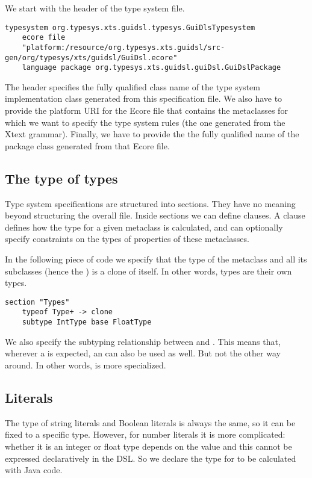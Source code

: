We start with the header of the type system file.

\begin{lstlisting}[language=xts] 
typesystem org.typesys.xts.guidsl.typesys.GuiDlsTypesystem 
    ecore file 
    "platform:/resource/org.typesys.xts.guidsl/src-gen/org/typesys/xts/guidsl/GuiDsl.ecore"
    language package org.typesys.xts.guidsl.guiDsl.GuiDslPackage 
\end{lstlisting}

The header specifies the fully qualified class name of the type system
implementation class generated from this specification file. We also have to
provide the platform URI for the Ecore file that contains the metaclasses for
which we want to specify the type system rules (the one generated from the Xtext
grammar). Finally, we have to provide the the fully qualified name of the
package class generated from that Ecore file.

\subsection{The type of types}

Type system specifications  are structured into sections. They have no meaning
beyond structuring the overall file. Inside sections we can define 
clauses. A  clause defines how the type for a given metaclass is
calculated, and can optionally specify constraints on the types of properties of
these metaclasses.

In the following piece of code we specify  that the type
of the  metaclass and all its subclasses (hence the \ic{+}) is a clone of itself.
In other words, types are their own types.

\begin{lstlisting}[language=xts] 
section "Types"
    typeof Type+ -> clone
    subtype IntType base FloatType
\end{lstlisting}

We also specify the subtyping relationship between  and . This
means that, wherever a  is expected, an  can also be
used as well.  But not the other way around. In other words,  is more
specialized.

\subsection{Literals}

The type of string literals and Boolean literals is always the same, so it can
be fixed to a specific type.
However, for number literals it is more complicated:
whether it is an integer or float type depends on the value and this cannot be
expressed declaratively in the DSL. So we declare the type for
 to be calculated with Java code.

